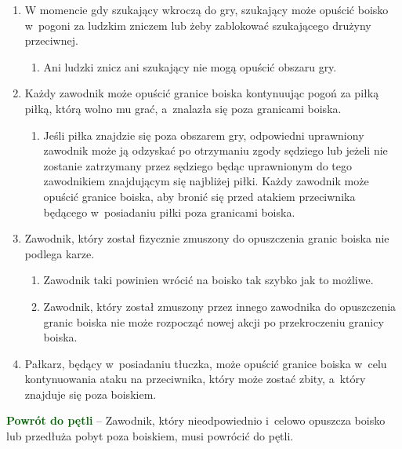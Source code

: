 \documentclass[12pt,a4paper]{article}
\newcommand\other[1]{\bgroup\textcolor{darkgreen}{\textbf{#1}}}
\begin{document}
\begin{enumerate}
	\item
	      W momencie gdy szukający wkroczą do gry, szukający może opuścić boisko
	      w~pogoni za ludzkim zniczem lub żeby zablokować szukającego drużyny
	      przeciwnej.

	      \begin{enumerate}
		      \item
		            Ani ludzki znicz ani szukający nie mogą opuścić obszaru gry.
	      \end{enumerate}
	\item
	      Każdy zawodnik może opuścić granice boiska kontynuując pogoń za piłką
	      piłką, którą wolno mu grać, a~znalazła się poza granicami boiska.

	      \begin{enumerate}
		      \item
		            Jeśli piłka znajdzie się poza obszarem gry, odpowiedni uprawniony
		            zawodnik może ją odzyskać po otrzymaniu zgody sędziego lub jeżeli
		            nie zostanie zatrzymany przez sędziego będąc uprawnionym do
				tego zawodnikiem znajdującym się najbliżej piłki.
				Każdy zawodnik może opuścić granice boiska, aby bronić się przed
				atakiem przeciwnika będącego w~posiadaniu piłki poza granicami boiska.
	      \end{enumerate}
	\item
	      Zawodnik, który został fizycznie zmuszony do opuszczenia granic boiska
	      nie podlega karze.

	      \begin{enumerate}
		      \item
		            Zawodnik taki powinien wrócić na boisko tak szybko jak to możliwe.
		      \item
		            Zawodnik, który został zmuszony przez innego zawodnika do
		            opuszczenia granic boiska nie może rozpocząć nowej akcji po
		            przekroczeniu granicy boiska.
	      \end{enumerate}
	\item
	      Pałkarz, będący w~posiadaniu tłuczka, może opuścić granice boiska w~celu kontynuowania ataku na przeciwnika, który może zostać zbity, a~który znajduje się poza boiskiem.
\end{enumerate}

\other{Powrót do pętli} -- Zawodnik, który nieodpowiednio i~celowo opuszcza
boisko lub przedłuża pobyt poza boiskiem, musi powrócić do pętli.
\end{document}
